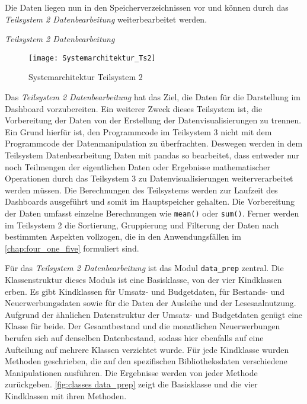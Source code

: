     Die Daten liegen nun in den Speicherverzeichnissen vor und können durch das \textit{Teilsystem 2 Datenbearbeitung} 
    weiterbearbeitet werden.
    
    \clearpage
    \noindent
    \textit{Teilsystem 2 Datenbearbeitung}

    \begin{figure}[H]
        \centering
            \texttt{[image: Systemarchitektur\_Ts2]}
            \caption{Systemarchitektur Teilsystem 2}
            \label{fig:Systemarchitektur Teilsystem 2}
    \end{figure}

    Das \textit{Teilsystem 2 Datenbearbeitung} hat das Ziel, die Daten für die Darstellung im Dashboard vorzubereiten. Ein weiterer Zweck dieses
    Teilsystem ist, die Vorbereitung der Daten von der Erstellung der Datenvisualisierungen zu trennen. Ein Grund hierfür
    ist, den Programmcode im Teilsystem 3 nicht mit dem Programmcode der Datenmanipulation zu überfrachten. 
    Deswegen werden in dem Teilsystem Datenbearbeitung Daten mit pandas so bearbeitet, 
    dass entweder nur noch Teilmengen der eigentlichen Daten oder Ergebnisse mathematischer Operationen durch das Teilsystem 3 
    zu Datenvisualisierungen weiterverarbeitet werden müssen. 
    Die Berechnungen des Teilsystems werden zur Laufzeit des Dashboards ausgeführt und somit im Hauptspeicher gehalten.
    Die Vorbereitung der Daten umfasst einzelne Berechnungen 
    wie \texttt{mean()} oder \texttt{sum()}. Ferner werden im Teilsystem 2 die Sortierung, Gruppierung und Filterung der 
    Daten nach bestimmten Aspekten vollzogen, die in den Anwendungsfällen im \autoref{chap:four_one_five} formuliert sind.
    
    Für das \textit{Teilsystem 2 Datenbearbeitung} ist das Modul \texttt{data\_prep} zentral. Die Klassenstruktur dieses Moduls ist eine 
    Basisklasse, von der vier Kindklassen erben. Es gibt Kindklassen für Umsatz- und Budgetdaten, für Bestands- und Neuerwerbungsdaten sowie für die Daten der Ausleihe und 
    der Lesesaalnutzung. Aufgrund der ähnlichen Datenstruktur der Umsatz- und Budgetdaten genügt eine Klasse für beide.
    Der Gesamtbestand und die monatlichen Neuerwerbungen berufen sich auf denselben Datenbestand, sodass hier ebenfalls auf eine Aufteilung auf mehrere Klassen verzichtet wurde.
    Für jede Kindklasse wurden Methoden geschrieben, die auf den spezifischen Bibliotheksdaten verschiedene Manipulationen ausführen.
    Die Ergebnisse werden von jeder Methode zurückgeben. \autoref{fig:classes data_prep} zeigt die Basisklasse und die vier Kindklassen mit ihren Methoden.

